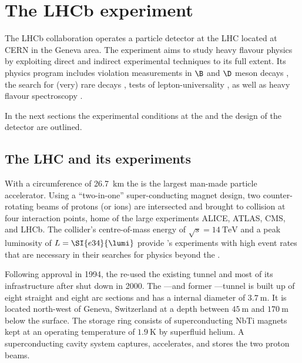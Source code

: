 
\chapter{The \acs*{LHCb} experiment}
\label{ch:lhcb_experiment}

The \ac{LHCb} collaboration operates a particle detector at the \ac{LHC}
located at \ac{CERN} in the Geneva area. The \LHCb experiment aims to study heavy
flavour physics by exploiting direct and indirect experimental techniques to its
full extent. Its physics program includes \CP violation measurements in $\B$ and
$\D$ meson decays
\cite{Aaij:2015tza,Aaij:2015yda,Aaij:2014uva,Aaij:2014fba,Aaij:2014dka,Aaij:2014zsa,Aaij:2014kxa}, 
the search for (very) rare decays \cite{CMS:2014xfa}, tests of
lepton-universality \cite{Aaij:2014ora,Aaij:2015yra}, as well as heavy flavour
spectroscopy \cite{Aaij:2014yka,Aaij:2015tga}.

In the next sections the experimental conditions at the \LHC and the design
of the \LHCb detector are outlined.

\section{The \acs*{LHC} and its experiments}
\label{sec:lhcb_experiment:lhc}

With a circumference of \SI{26.7}{\kilo\metre} the \LHC is the largest man-made
particle accelerator. Using a \enquote{two-in-one} super-conducting magnet
design, two counter-rotating beams of protons (or ions) are intersected and
brought to collision at four interaction points, home of the large \LHC
experiments \acs*{ALICE}, \acs*{ATLAS}, \acs*{CMS}, and \acs*{LHCb}. The
collider's centre-of-mass energy of $\sqrt{s}=\SI{14}{\TeV}$ and a peak
luminosity of $L=\SI{e34}{\lumi}$ provide \LHC's experiments with high event
rates that are necessary in their searches for physics beyond the \SM.

Following approval in 1994, the \LHC re-used the existing \LEP tunnel and most
of its infrastructure after \LEP shut down in 2000. The \LHC---and former
\LEP---tunnel is built up of eight straight and eight arc sections and has a
internal diameter of $\SI{3.7}{\metre}$. It is located north-west of Geneva,
Switzerland at a depth between $\SI{45}{\metre}$ and $\SI{170}{\metre}$ below
the surface. The storage ring consists of superconducting NbTi magnets kept at
an operating temperature of $\SI{1.9}{\kelvin}$ by superfluid helium. A
superconducting \RF cavity system captures, accelerates, and stores the two
proton beams.

